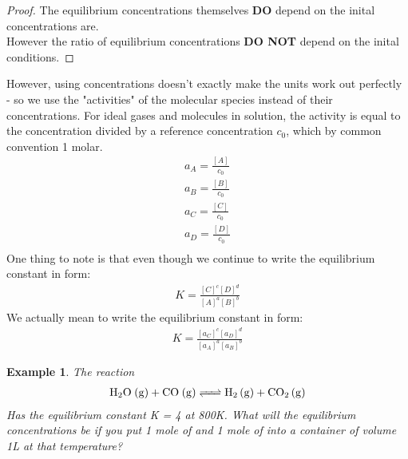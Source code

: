 \documentclass{article}  %
\newtheorem{exmp}{Example}
\newtheorem{proof}{Statement}
\begin{document}
\begin{proof}
    The equilibrium concentrations themselves \textbf{DO} depend on the inital concentrations are. \\
    However the ratio of equilibrium concentrations \textbf{DO NOT} depend on the inital conditions.
\end{proof}

However, using concentrations doesn't exactly make the units work out perfectly - so we use the "activities" of the molecular species instead of their concentrations. For ideal gases and molecules in solution, the activity is equal to the concentration divided by a reference concentration $c_0$, which by common convention 1 molar.
\begin{equation*}
    \begin{aligned}
        a_A  = \frac{[A]}{c_0} \\
        a_B  =\frac{[B]}{c_0} \\
        a_C  = \frac{[C]}{c_0} \\
        a_D  =\frac{[D]}{c_0} \\ 
    \end{aligned}
\end{equation*}
One thing to note is that even though we continue to write the equilibrium constant in form:
\begin{equation*}
    \begin{aligned}
        K = \frac{[C]^c[D]^d}{[A]^a[B]^b} 
    \end{aligned}
\end{equation*}
We actually mean to write the equilibrium constant in form:
\begin{equation*}
    \begin{aligned}
        K = \frac{[a_C]^c[a_D]^d}{[a_A]^a[a_B]^b} 
    \end{aligned}
\end{equation*}

\begin{exmp}
    The reaction 
    \begin{equation*}
        \begin{aligned}
            \ce{H_2O (g) + CO (g) <=> H_2 (g) + CO_2 (g)}
        \end{aligned}
    \end{equation*}
    Has the equilibrium constant K = 4 at 800K. What will the equilibrium concentrations be if you put 1 mole of  and 1 mole of  into a container of volume 1L at that temperature?
\end{exmp}
\end{document}
